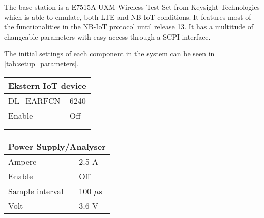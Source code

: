 The base station is a E7515A UXM Wireless Test Set from Keysight Technologies which is able to emulate, both LTE and NB-IoT conditions. It features most of the functionalities in the NB-IoT protocol until release 13. It has a multitude of changeable parameters with easy access through a SCPI interface. \citep{UXM}

The initial settings of each component in the system can be seen in \autoref{tab:setup_parameters}.

\begin{table}[H]
\captionsetup{belowskip=0em}
\noindent
\centering
\begin{minipage}[t]{0.48\textwidth}
\begin{tabular}{|p{4cm}|p{2cm}|} \hline
\multicolumn{2}{|c|}{\textbf{Ekstern IoT device}}   \\ \hline
DL\_EARFCN         & 6240           \\ \hline
Enable             & Off            \\ \hline
\multicolumn{2}{c}{}  \\ 
\multicolumn{2}{c}{}  \\ 
\end{tabular}
\end{minipage}%
\hfill
\begin{minipage}[t]{0.48\textwidth}
\raggedleft
\begin{tabular}{|p{4cm}|p{2cm}|} \hline
\multicolumn{2}{|c|}{\textbf{Power Supply/Analyser}} \\ \hline
Ampere             & 2.5 A          \\ \hline
Enable             & Off            \\ \hline
Sample interval	   & 100 $\mu$s		\\ \hline
Volt               & 3.6 V          \\ \hline
\end{tabular}
\vspace{1em}
\end{minipage}
\end{table}

